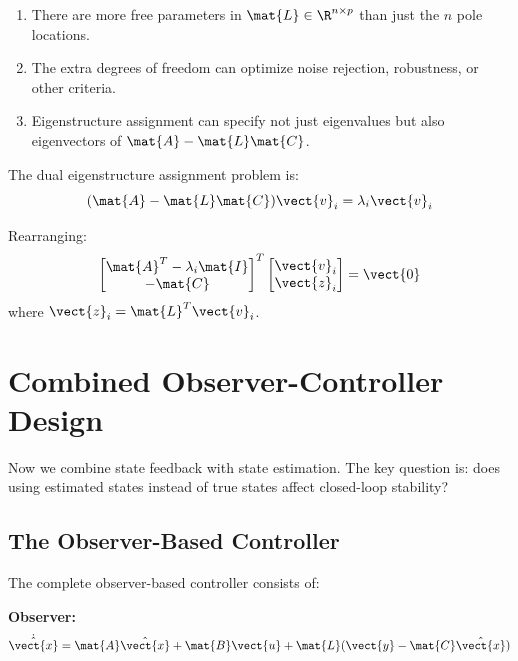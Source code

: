 \begin{enumerate}
    \item There are more free parameters in $\mat{L} \in \R^{n \times p}$ than just the $n$ pole locations.
    \item The extra degrees of freedom can optimize noise rejection, robustness, or other criteria.
    \item Eigenstructure assignment can specify not just eigenvalues but also eigenvectors of $\mat{A} - \mat{L}\mat{C}$.
\end{enumerate}

The dual eigenstructure assignment problem is:
\begin{equation}
(\mat{A} - \mat{L}\mat{C})\vect{v}_i = \lambda_i\vect{v}_i
\end{equation}

Rearranging:
\begin{equation}
\begin{bmatrix} \mat{A}^T - \lambda_i\mat{I} \\ -\mat{C} \end{bmatrix}^T
\begin{bmatrix} \vect{v}_i \\ \vect{z}_i \end{bmatrix} = \vect{0}
\end{equation}
where $\vect{z}_i = \mat{L}^T\vect{v}_i$.

\section{Combined Observer-Controller Design}
\label{sec:observer_controller}

Now we combine state feedback with state estimation. The key question is: does using estimated states instead of true states affect closed-loop stability?

\subsection{The Observer-Based Controller}

The complete observer-based controller consists of:

\textbf{Observer:}
\begin{equation}
\dot{\hat{\vect{x}}} = \mat{A}\hat{\vect{x}} + \mat{B}\vect{u} + \mat{L}(\vect{y} - \mat{C}\hat{\vect{x}})
\label{eq:observer_complete}
\end{equation}

